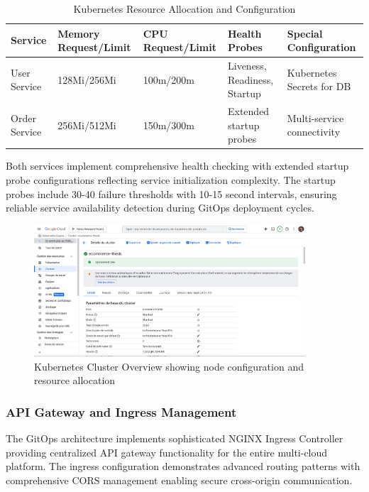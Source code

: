 \begin{table}[H]
\centering
\caption{Kubernetes Resource Allocation and Configuration}
\label{tab:kubernetes-resource-allocation}
\begin{tabular}{|p{3cm}|p{2.5cm}|p{2.5cm}|p{3cm}|p{3cm}|}
\hline
\textbf{Service} & \textbf{Memory Request/Limit} & \textbf{CPU Request/Limit} & \textbf{Health Probes} & \textbf{Special Configuration} \\
\hline
User Service & 128Mi/256Mi & 100m/200m & Liveness, Readiness, Startup & Kubernetes Secrets for DB \\
\hline
Order Service & 256Mi/512Mi & 150m/300m & Extended startup probes & Multi-service connectivity \\
\hline
\end{tabular}
\end{table}

Both services implement comprehensive health checking with extended startup probe configurations reflecting service initialization complexity. The startup probes include 30-40 failure thresholds with 10-15 second intervals, ensuring reliable service availability detection during GitOps deployment cycles.

\begin{figure}[H]
\centering
\includegraphics[width=0.9\textwidth]{figures/chapter4/kubernetes-cluster-overview.png}
\caption{Kubernetes Cluster Overview showing node configuration and resource allocation}
\label{fig:kubernetes-cluster-overview}
\end{figure}

\subsubsection{API Gateway and Ingress Management}

The GitOps architecture implements sophisticated NGINX Ingress Controller providing centralized API gateway functionality for the entire multi-cloud platform. The ingress configuration demonstrates advanced routing patterns with comprehensive CORS management enabling secure cross-origin communication.

